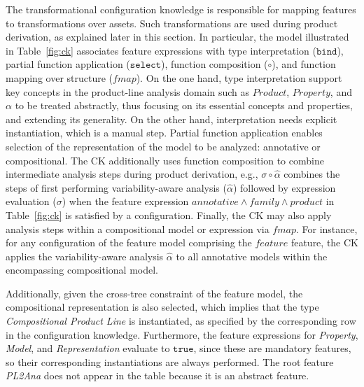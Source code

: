 The transformational configuration knowledge is responsible for mapping features to transformations over assets. Such transformations are used during product derivation, as explained later in this section. In particular, the model illustrated in Table~\ref{fig:ck} associates feature expressions with type interpretation ($\mathtt{bind}$), partial function application ($\mathtt{select}$), function composition ($\circ$), and function mapping over structure ($\mathit{fmap}$). On the one hand, type interpretation support key concepts in the product-line analysis domain such as $Product$, $Property$, and $\alpha$ to be treated abstractly, thus focusing on its essential concepts and properties, and extending its generality. On the other hand, interpretation needs explicit instantiation, which is a manual step. Partial function application enables selection of the representation of the model to be analyzed: annotative or compositional. The CK additionally uses function composition to combine intermediate analysis steps during product derivation, e.g., 
$\sigma \circ \hat{\alpha}$ combines  the steps of first performing variability-aware analysis ($\hat{\alpha}$) followed by expression evaluation ($\sigma$) when the feature expression $\mathit{annotative} \land \mathit{family} \land \mathit{product}$ in Table~\ref{fig:ck} is satisfied by a configuration. Finally, the CK may also apply analysis steps within a compositional model or expression via $\mathit{fmap}$. For instance, for any configuration of the feature model comprising  the $\mathit{feature}$ feature, the CK applies the variability-aware analysis $\hat{\alpha}$ to all annotative models within the encompassing compositional model.

Additionally, given the cross-tree constraint of the feature model, the compositional representation is also selected, which implies that the type \textit{Compositional Product Line} is instantiated, as specified by the corresponding row in the configuration knowledge. Furthermore, the feature expressions for \textit{Property}, \textit{Model}, and \textit{Representation} evaluate to $\mathtt{true}$, since these are mandatory features, so their corresponding instantiations are always performed. The root feature \textit{PL2Ana} does not appear in the table because it is an abstract feature.



